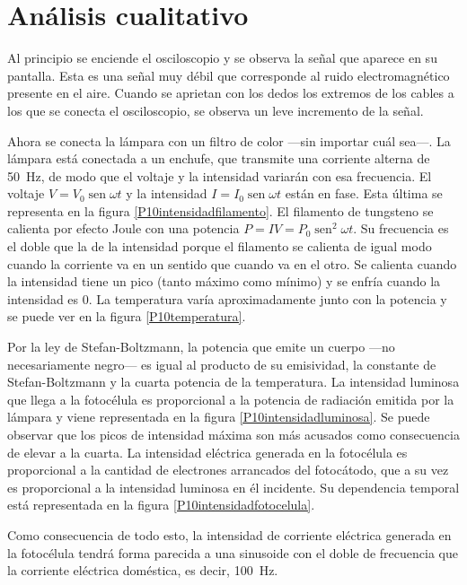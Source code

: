 \documentclass[12pt]{article}
\numberwithin{table}{section}
\numberwithin{figure}{section}
\numberwithin{equation}{section}
\DeclareMathOperator{\sen}{sen}
\begin{document}
\section{Análisis cualitativo}
Al principio se enciende el osciloscopio y se observa la señal que aparece en su pantalla. Esta es una señal muy débil que corresponde al ruido electromagnético presente en el aire. Cuando se aprietan con los dedos los extremos de los cables a los que se conecta el osciloscopio, se observa un leve incremento de la señal.

Ahora se conecta la lámpara con un filtro de color ---sin importar cuál sea---. La lámpara está conectada a un enchufe, que transmite una corriente alterna de \SI{50}{Hz}, de modo que el voltaje y la intensidad variarán con esa frecuencia. El voltaje $V=V_0\sen\omega t$ y la intensidad $I=I_0\sen\omega t$ están en fase. Esta última se representa en la figura \ref{P10intensidadfilamento}. El filamento de tungsteno se calienta por efecto Joule con una potencia $P=IV=P_0\sen^2\omega t$. Su frecuencia es el doble que la de la intensidad porque el filamento se calienta de igual modo cuando la corriente va en un sentido que cuando va en el otro. Se calienta cuando la intensidad tiene un pico (tanto máximo como mínimo) y se enfría cuando la intensidad es 0. La temperatura varía aproximadamente junto con la potencia y se puede ver en la figura \ref{P10temperatura}.

Por la ley de Stefan-Boltzmann, la potencia que emite un cuerpo ---no necesariamente negro--- es igual al producto de su emisividad, la constante de Stefan-Boltzmann y la cuarta potencia de la temperatura. La intensidad luminosa que llega a la fotocélula es proporcional a la potencia de radiación emitida por la lámpara y viene representada en la figura \ref{P10intensidadluminosa}. Se puede observar que los picos de intensidad máxima son más acusados como consecuencia de elevar a la cuarta. La intensidad eléctrica generada en la fotocélula es proporcional a la cantidad de electrones arrancados del fotocátodo, que a su vez es proporcional a la intensidad luminosa en él incidente. Su dependencia temporal está representada en la figura \ref{P10intensidadfotocelula}.

Como consecuencia de todo esto, la intensidad de corriente eléctrica generada en la fotocélula tendrá forma parecida a una sinusoide con el doble de frecuencia que la corriente eléctrica doméstica, es decir, \SI{100}{Hz}.
\end{document}
